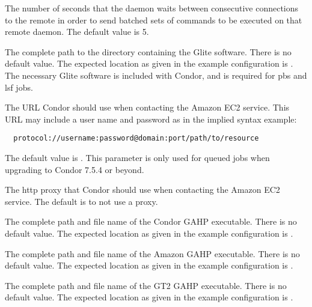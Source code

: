 \begin{description}
\label{param:CGAHPContactScheddDelay}
\item[\Macro{C\_GAHP\_CONTACT\_SCHEDD\_DELAY}]
  The number of seconds that the  daemon waits between
  consecutive connections to the remote  in order to
  send batched sets of commands to be executed on that remote 
  daemon.
  The default value is 5.

\label{param:GLITELocation}
\item[\Macro{GLITE\_LOCATION}]
  The complete path to the directory containing the Glite software.
  There is no default value. The expected location as given
  in the example configuration is .
  The necessary Glite software is included with Condor,
  and is required for pbs and lsf jobs.

\label{param:AmazonEC2URL}
\item[\Macro{AMAZON\_EC2\_URL}]
  The URL Condor should use when contacting the Amazon EC2 service.
  This URL may include a user name and password as in the implied
  syntax example:
\footnotesize
\begin{verbatim}
  protocol://username:password@domain:port/path/to/resource
\end{verbatim}
\normalsize
  The default value is .
  This parameter is only used for queued jobs when upgrading to Condor
  7.5.4 or beyond.

\label{param:AmazonHttpProxy}
\item[\Macro{AMAZON\_HTTP\_PROXY}]
  The http proxy that Condor should use when contacting the Amazon EC2
  service. The default is to not use a proxy.

\label{param:CondorGAHP}
\item[\Macro{CONDOR\_GAHP}]
  The complete path and file name of the Condor GAHP executable.
  There is no default value. The expected location as given
  in the example configuration is .

\label{param:AmazonGAHP}
\item[\Macro{AMAZON\_GAHP}]
  The complete path and file name of the Amazon GAHP executable.
  There is no default value. The expected location as given
  in the example configuration is .

\label{param:GT2GAHP}
\item[\Macro{GT2\_GAHP}]
  The complete path and file name of the GT2 GAHP executable.
  There is no default value. The expected location as given
  in the example configuration is .


\end{description}
